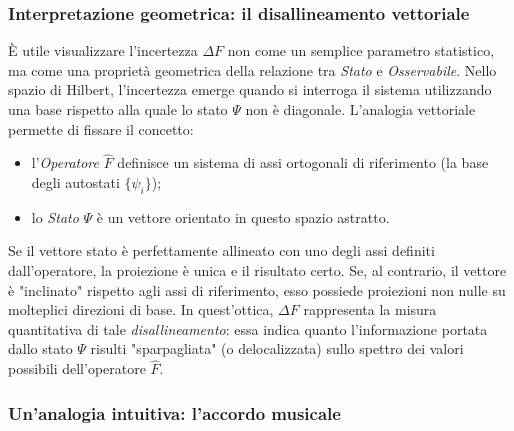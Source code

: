 \documentclass[a4paper,11pt]{report}
\begin{document}
\subsubsection{Interpretazione geometrica: il disallineamento vettoriale}
È utile visualizzare l'incertezza $\Delta F$ non come un semplice parametro statistico, ma come una proprietà geometrica della relazione tra \textit{Stato} e \textit{Osservabile}.
Nello spazio di Hilbert, l'incertezza emerge quando si interroga il sistema utilizzando una base rispetto alla quale lo stato $\Psi$ non è diagonale.
L'analogia vettoriale permette di fissare il concetto:
\begin{itemize}
    \item l'\textit{Operatore} $\hat{F}$ definisce un sistema di assi ortogonali di riferimento (la base degli autostati $\{\psi_i\}$);
    \item lo \textit{Stato} $\Psi$ è un vettore orientato in questo spazio astratto.
\end{itemize}
Se il vettore stato è perfettamente allineato con uno degli assi definiti dall'operatore, la proiezione è unica e il risultato certo.
Se, al contrario, il vettore è "inclinato" rispetto agli assi di riferimento, esso possiede proiezioni non nulle su molteplici direzioni di base.
In quest'ottica, $\Delta F$ rappresenta la misura quantitativa di tale \textit{disallineamento}: essa indica quanto l'informazione portata dallo stato $\Psi$ risulti "sparpagliata" (o delocalizzata) sullo spettro dei valori possibili dell'operatore $\hat{F}$.

\subsubsection{Un'analogia intuitiva: l'accordo musicale}
\end{document}
